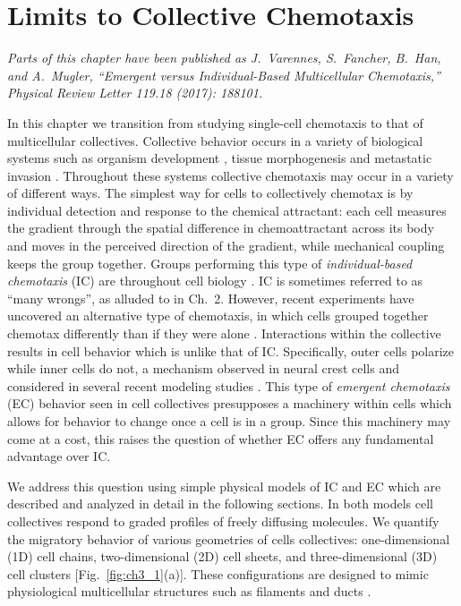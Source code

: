 
\chapter{Limits to Collective Chemotaxis}

\textit{Parts of this chapter have been published as J.\ Varennes, S.\ Fancher, B.\ Han, and A.\ Mugler, ``Emergent versus Individual-Based Multicellular Chemotaxis,'' Physical Review Letter 119.18 (2017): 188101.}
\vspace{5mm}

\noindent
In this chapter we transition from studying single-cell chemotaxis to that of multicellular collectives.
Collective behavior occurs in a variety of biological systems such as organism development \cite{theveneau2010collective,cai2016modeling,bianco2007two,montell2008morphogenetic},
tissue morphogenesis \cite{ellison2016cell} and metastatic invasion
\cite{kim2013cooperative,friedl2009collective,friedl2012classifying,deisboeck2009collective}.
Throughout these systems collective chemotaxis may occur in a variety of different ways. The simplest way for cells to collectively chemotax is by individual detection and response to the chemical attractant: each cell measures the gradient through the spatial difference in chemoattractant across its body and moves in the perceived direction of the gradient, while mechanical coupling keeps the group together. Groups performing this type of \textit{individual-based chemotaxis} (IC) are throughout cell biology \cite{kulesa1998neural}.
IC is sometimes referred to as ``many wrongs'', as alluded to in Ch.\ 2.
However, recent experiments have uncovered an alternative type of chemotaxis, in which cells grouped together chemotax differently than if they were alone \cite{haeger2015collective,malet2015collective,leber2009molecular,gaggioli2007fibroblast}.
Interactions within the collective results in cell behavior which is unlike that of IC.
Specifically, outer cells polarize while inner cells do not, a mechanism observed in neural crest cells \cite{theveneau2010collective} and considered in several recent modeling studies
\cite{malet2015collective,camley2016emergent,varennes2016collective}. This type of \textit{emergent chemotaxis} (EC) behavior seen in cell collectives presupposes a machinery within cells which allows for behavior to change once a cell is in a group. Since this machinery may come at a cost, this raises the question of whether EC offers any fundamental advantage over IC.

We address this question using simple physical models of IC and EC which are described and analyzed in detail in the following sections. In both models cell collectives respond to graded profiles of freely diffusing molecules. We quantify the migratory behavior of various geometries of cells collectives: one-dimensional (1D) cell chains, two-dimensional (2D) cell sheets, and three-dimensional (3D) cell clusters [Fig.\ \ref{fig:ch3_1}(a)]. These configurations are designed to mimic physiological multicellular structures such as filaments and ducts \cite{cheung2013collective,friedl2009collective,bardeesy2002pancreatic}.

